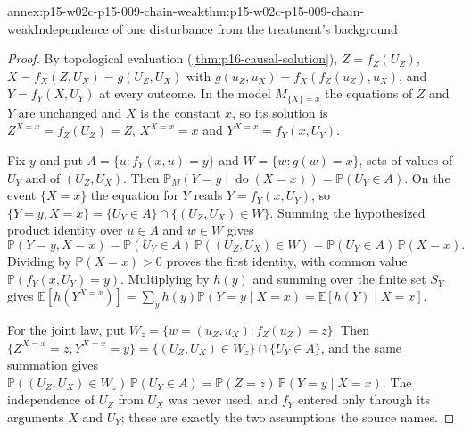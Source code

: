 \begin{annexitem}{annex:p15-w02c-p15-009-chain-weak}{thm:p15-w02c-p15-009-chain-weak}{Independence of one disturbance from the treatment's background}
\begin{proof}
By topological evaluation (\cref{thm:p16-causal-solution}),
\(Z=f_Z(U_Z)\), \(X=f_X(Z,U_X)=g(U_Z,U_X)\) with
\(g(u_Z,u_X)=f_X(f_Z(u_Z),u_X)\), and \(Y=f_Y(X,U_Y)\) at every
outcome. In the model \(M_{\{X\}=x}\) the equations of \(Z\) and \(Y\)
are unchanged and \(X\) is the constant \(x\), so its solution is
\(Z^{X=x}=f_Z(U_Z)=Z\), \(X^{X=x}=x\) and \(Y^{X=x}=f_Y(x,U_Y)\).

Fix \(y\) and put \(A=\{u:f_Y(x,u)=y\}\) and
\(W=\{w:g(w)=x\}\), sets of values of \(U_Y\) and of \((U_Z,U_X)\). Then
\(\mathbb P_M(Y=y\mid\operatorname{do}(X=x))=\mathbb P(U_Y\in A)\). On
the event \(\{X=x\}\) the equation for \(Y\) reads \(Y=f_Y(x,U_Y)\),
so \(\{Y=y,X=x\}=\{U_Y\in A\}\cap\{(U_Z,U_X)\in W\}\). Summing the
hypothesized product identity over \(u\in A\) and \(w\in W\) gives
\[
 \mathbb P(Y=y,X=x)=\mathbb P(U_Y\in A)\,\mathbb P((U_Z,U_X)\in W)
                   =\mathbb P(U_Y\in A)\,\mathbb P(X=x).
\]
Dividing by \(\mathbb P(X=x)>0\) proves the first identity, with common
value \(\mathbb P(f_Y(x,U_Y)=y)\). Multiplying by \(h(y)\) and summing
over the finite set \(S_Y\) gives
\(\mathbb E[h(Y^{X=x})]=\sum_yh(y)\mathbb P(Y=y\mid X=x)
=\mathbb E[h(Y)\mid X=x]\).

For the joint law, put \(W_z=\{w=(u_Z,u_X):f_Z(u_Z)=z\}\). Then
\(\{Z^{X=x}=z,Y^{X=x}=y\}=\{(U_Z,U_X)\in W_z\}\cap\{U_Y\in A\}\), and
the same summation gives
\(\mathbb P((U_Z,U_X)\in W_z)\,\mathbb P(U_Y\in A)
=\mathbb P(Z=z)\,\mathbb P(Y=y\mid X=x)\). The independence of \(U_Z\)
from \(U_X\) was never used, and \(f_Y\) entered only through its
arguments \(X\) and \(U_Y\); these are exactly the two assumptions the
source names.
\end{proof}
\end{annexitem}

